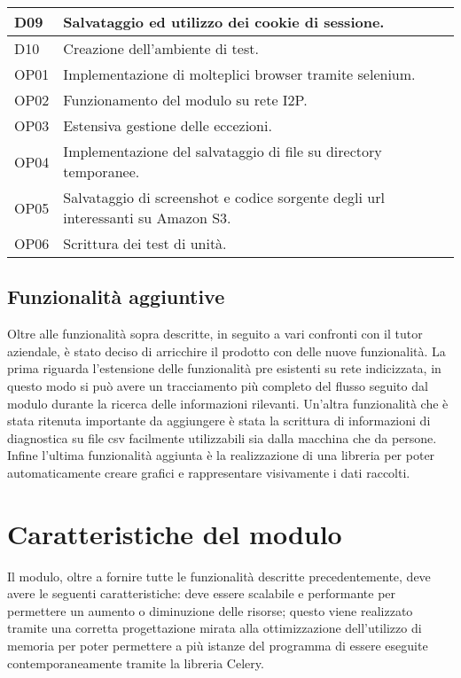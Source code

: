 \begin{longtable}{|p{}|p{}|}
    \hline
    D09			&	Salvataggio ed utilizzo dei cookie di sessione. \\
    \hline
    D10			&	Creazione dell'ambiente di test. \\
    \hline
    OP01		&	Implementazione di molteplici browser tramite selenium. \\
    \hline
    OP02		&	Funzionamento del modulo su rete I2P. \\
    \hline
    OP03		&	Estensiva gestione delle eccezioni. \\
    \hline
    OP04		&	Implementazione del salvataggio di file su directory temporanee. \\
    \hline
    OP05		&	Salvataggio di screenshot e codice sorgente degli url interessanti su Amazon S3. \\
    \hline
    OP06		&	Scrittura dei test di unità. \\
    \hline
\end{longtable}%

\subsection{Funzionalità aggiuntive}

Oltre alle funzionalità sopra descritte, in seguito a vari confronti con il tutor aziendale, è stato deciso di arricchire il prodotto con delle nuove funzionalità. \newline{}
La prima riguarda l'estensione delle funzionalità pre esistenti su rete indicizzata, in questo modo si può avere un tracciamento più completo del flusso seguito dal modulo durante la ricerca delle informazioni rilevanti. Un'altra funzionalità che è stata ritenuta importante da aggiungere è stata la scrittura di informazioni di diagnostica su file csv facilmente utilizzabili sia dalla macchina che da persone. \newline{} Infine l'ultima funzionalità aggiunta è la realizzazione di una libreria per poter automaticamente creare grafici e rappresentare visivamente i dati raccolti.


\section{Caratteristiche del modulo}

Il modulo, oltre a fornire tutte le funzionalità descritte precedentemente, deve avere le
seguenti caratteristiche: deve essere scalabile e performante per permettere un aumento o diminuzione delle risorse; questo viene realizzato tramite una corretta progettazione mirata alla ottimizzazione dell'utilizzo di memoria per poter permettere a più istanze del programma di essere eseguite contemporaneamente tramite la libreria Celery.